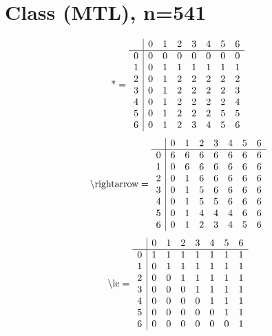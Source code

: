 \documentclass[11pt]{article}
\begin{document}
\section{Class (MTL), n=541}
\[\text{*} = 
\begin{array}{r | r r r r r r r}
 & 0 & 1 & 2 & 3 & 4 & 5 & 6 \\ \hline
0 & 0 & 0 & 0 & 0 & 0 & 0 & 0 \\
1 & 0 & 1 & 1 & 1 & 1 & 1 & 1 \\
2 & 0 & 1 & 2 & 2 & 2 & 2 & 2 \\
3 & 0 & 1 & 2 & 2 & 2 & 2 & 3 \\
4 & 0 & 1 & 2 & 2 & 2 & 2 & 4 \\
5 & 0 & 1 & 2 & 2 & 2 & 5 & 5 \\
6 & 0 & 1 & 2 & 3 & 4 & 5 & 6 \\
\end{array}
\]
\[\text{\textbackslash rightarrow} = 
\begin{array}{r | r r r r r r r}
 & 0 & 1 & 2 & 3 & 4 & 5 & 6 \\ \hline
0 & 6 & 6 & 6 & 6 & 6 & 6 & 6 \\
1 & 0 & 6 & 6 & 6 & 6 & 6 & 6 \\
2 & 0 & 1 & 6 & 6 & 6 & 6 & 6 \\
3 & 0 & 1 & 5 & 6 & 6 & 6 & 6 \\
4 & 0 & 1 & 5 & 5 & 6 & 6 & 6 \\
5 & 0 & 1 & 4 & 4 & 4 & 6 & 6 \\
6 & 0 & 1 & 2 & 3 & 4 & 5 & 6 \\
\end{array}
\]
\[\text{\textbackslash le} = 
\begin{array}{r | r r r r r r r}
 & 0 & 1 & 2 & 3 & 4 & 5 & 6 \\ \hline
0 & 1 & 1 & 1 & 1 & 1 & 1 & 1 \\
1 & 0 & 1 & 1 & 1 & 1 & 1 & 1 \\
2 & 0 & 0 & 1 & 1 & 1 & 1 & 1 \\
3 & 0 & 0 & 0 & 1 & 1 & 1 & 1 \\
4 & 0 & 0 & 0 & 0 & 1 & 1 & 1 \\
5 & 0 & 0 & 0 & 0 & 0 & 1 & 1 \\
6 & 0 & 0 & 0 & 0 & 0 & 0 & 1 \\
\end{array}
\]
\end{document}
